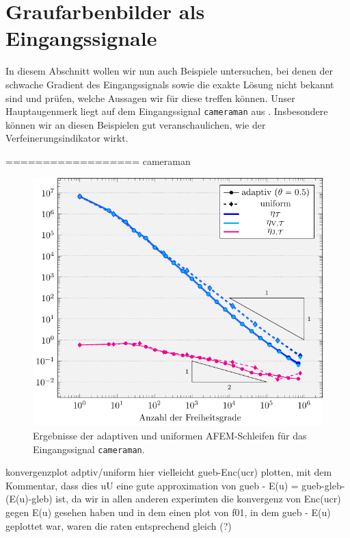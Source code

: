 \section{Graufarbenbilder als Eingangssignale}
\label{sec:grayscalePicturesAsInputSignal}

In diesem Abschnitt wollen wir nun auch Beispiele untersuchen, bei denen
der schwache Gradient des Eingangssignals sowie die exakte Lösung nicht bekannt
sind und prüfen, welche Aussagen wir für diese treffen können.
Unser Hauptaugenmerk liegt auf dem Eingangssignal \texttt{cameraman} aus
. 
Insbesondere können wir an diesen Beispielen gut veranschaulichen, wie
der Verfeinerungsindikator wirkt.

==================
cameraman 

\begin{figure}[p]
  \centering
  \includegraphics[width=\linewidth]
    {pictures/chapExperiments/secGrayscale/cam/conv.pdf}
  \caption{Ergebnisse der adaptiven und uniformen AFEM-Schleifen für das 
  Eingangssignal \texttt{cameraman}.}
  \label{fig:camConvergence}
\end{figure}

konvergenzplot adptiv/uniform
hier vielleicht gueb-Enc(ucr) plotten, mit dem Kommentar, dass dies uU
eine gute approximation von gueb - E(u) = gueb-gleb-(E(u)-gleb) ist, da 
wir in allen anderen experimten die konvergenz von Enc(ucr) gegen E(u) gesehen
haben und in dem einen plot von f01, in dem gueb - E(u) geplottet war,
 waren die raten entsprechend gleich (?)

